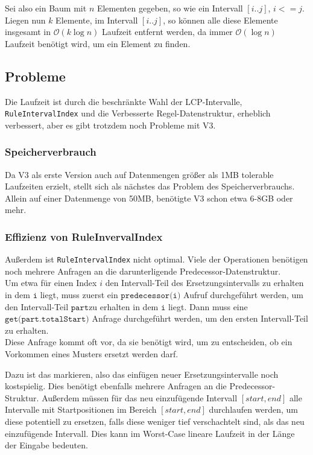 Sei also ein Baum mit $n$ Elementen gegeben, so wie ein Intervall $[i..j]$, $i <= j$. Liegen nun $k$ Elemente, im Intervall $[i..j]$, so können alle diese Elemente insgesamt in $\mathcal{O}(k \log n)$ Laufzeit entfernt werden, da immer $\mathcal{O}(\log n)$ Laufzeit benötigt wird, um ein Element zu finden.

\subsection{Probleme}


Die Laufzeit ist durch die beschränkte Wahl der LCP-Intervalle, \texttt{RuleIntervalIndex} und die Verbesserte Regel-Datenstruktur, erheblich verbessert, aber es gibt trotzdem noch Probleme mit V3.

\subsubsection{Speicherverbrauch}
Da V3 als erste Version auch auf Datenmengen größer als 1MB tolerable Laufzeiten erzielt, stellt sich als nächstes das Problem des Speicherverbrauchs. Allein auf einer Datenmenge von 50MB, benötigte V3 schon etwa 6-8GB oder mehr.

\subsubsection{Effizienz von RuleInvervalIndex}

Außerdem ist \texttt{RuleIntervalIndex} nicht optimal. Viele der Operationen benötigen noch mehrere Anfragen an die darunterligende Predecessor-Datenstruktur.\\
Um etwa für einen Index $i$ den Intervall-Teil des Ersetzungsintervalls zu erhalten in dem $\texttt{i}$ liegt, muss zuerst ein $\texttt{predecessor(i)}$ Aufruf durchgeführt werden, um den Intervall-Teil $\texttt{part}$zu erhalten in dem $\texttt{i}$ liegt. Dann muss eine $\texttt{get(part.totalStart)}$ Anfrage durchgeführt werden, um den ersten Intervall-Teil zu erhalten.\\
Diese Anfrage kommt oft vor, da sie benötigt wird, um zu entscheiden, ob ein Vorkommen eines Musters ersetzt werden darf.

Dazu ist das markieren, also das einfügen neuer Ersetzungsintervalle noch kostspielig. Dies benötigt ebenfalls mehrere Anfragen an die Predecessor-Struktur. Außerdem müssen für das neu einzufügende Intervall $[start, end]$ alle Intervalle mit Startpositionen im Bereich $[start, end]$ durchlaufen werden, um diese potentiell zu ersetzen, falls diese weniger tief verschachtelt sind, als das neu einzufügende Intervall. Dies kann im Worst-Case lineare Laufzeit in der Länge der Eingabe bedeuten.

